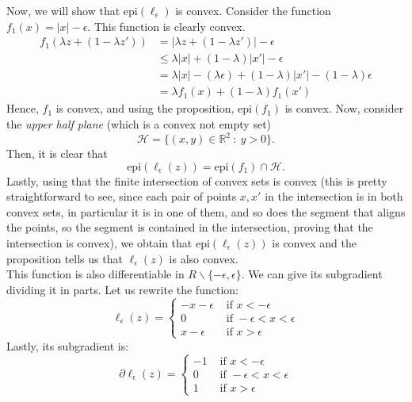 \documentclass[11pt,table]{article}
\newcommand\abs[1]{\lvert#1\rvert}
\newcommand\R{\mathbb R}
\begin{document}
Now, we will show that \(\text{epi}(\ell_\epsilon)\) is convex. Consider the function \(f_1(x) = \abs{x} - \epsilon\). This function is clearly convex.
\begin{align*}
	f_1(\lambda z + (1-\lambda z')) & = \abs{\lambda z + (1-\lambda z')} - \epsilon                                      \\
	                                & \leq \lambda \abs{x} + (1-\lambda)\abs{x'} - \epsilon                              \\
	                                & = \lambda \abs{x} - (\lambda \epsilon) + (1-\lambda)\abs{x'} - (1-\lambda)\epsilon \\
	                                & = \lambda f_1(x) + (1-\lambda)f_1(x')
\end{align*}
Hence, \(f_1\) is convex, and using the proposition, \(\text{epi}(f_1)\) is convex. Now, consider the \emph{upper half plane} (which is a convex not empty set)
\[
	\mathcal H = \{ (x,y) \in \R^2 \ : \ y > 0\}.
\]
Then, it is clear that
\[
	\text{epi}(\ell_\epsilon(z)) = \text{epi}(f_1) \cap \mathcal H.
\]
Lastly, using that the finite intersection of convex sets is convex (this is pretty straightforward to see, since each pair of points \(x,x'\) in the intersection is in both convex sets, in particular it is in one of them, and so does the segment that aligns the points, so the segment is contained in the intersection, proving that the intersection is convex), we obtain that \(\text{epi}(\ell_\epsilon(z))\) is convex and the proposition tells us that \(\ell_\epsilon(z)\) is also convex.\\

This function is also differentiable in \(R \backslash \{-\epsilon,\epsilon\}\). We can give its subgradient dividing it in parts. Let us rewrite the function:
\[
	\ell_\epsilon(z) = \begin{cases}
		-x-\epsilon & \text{ if } x < - \epsilon           \\
		0           & \text{ if } -\epsilon < x < \epsilon \\
		x-\epsilon  & \text{ if } x> \epsilon
	\end{cases}
\]
Lastly, its subgradient is:
\[
	\partial \ell_\epsilon(z) = \begin{cases}
		-1 & \text{ if } x < - \epsilon           \\
		0  & \text{ if } -\epsilon < x < \epsilon \\
		1  & \text{ if } x> \epsilon
	\end{cases}
\]
\end{document}
